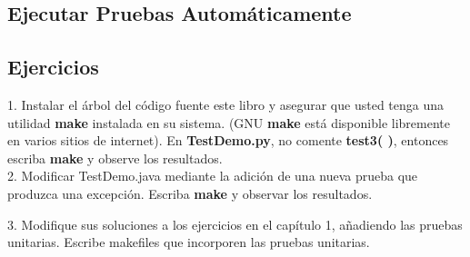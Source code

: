 \newpage

\subsection*{Ejecutar Pruebas Automáticamente}
\label{subsec:epa}


\subsection*{Ejercicios}
\label{subsec:ex}


        1. Instalar el árbol del código fuente este libro y asegurar que usted tenga una utilidad \textbf{make} instalada en su sistema. (GNU \textbf{make} está disponible libremente en varios sitios de internet). En \textbf{TestDemo.py}, no comente \textbf{test3( )}, entonces escriba \textbf{make} y observe los resultados. \\
        
        2. Modificar TestDemo.java mediante la adición de una nueva prueba que produzca una excepción. Escriba \textbf{make} y observar los resultados.\newline
        
        3. Modifique sus soluciones a los ejercicios en el capítulo 1, añadiendo las pruebas unitarias. Escribe makefiles que incorporen las pruebas unitarias. \newline
        
        